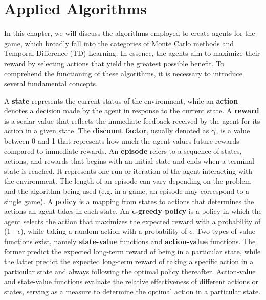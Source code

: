 \chapter{Applied Algorithms}
\label{applied_algo_chapter}
In this chapter, we will discuss the algorithms employed to create agents for the game, which broadly fall into the categories of Monte Carlo methods and Temporal Difference (TD) Learning. In essence, the agents aim to maximize their reward by selecting actions that yield the greatest possible benefit. To comprehend the functioning of these algorithms, it is necessary to introduce several fundamental concepts. 

A \textbf{state} represents the current status of the environment, while an \textbf{action} denotes a decision made by the agent in response to the current state. A \textbf{reward} is a scalar value that reflects the immediate feedback received by the agent for its action in a given state. The \textbf{discount factor}, usually denoted as $\bm{\gamma}$, is a value between 0 and 1 that represents how much the agent values future rewards compared to immediate rewards. An \textbf{episode} refers to a sequence of states, actions, and rewards that begins with an initial state and ends when a terminal state is reached. It represents one run or iteration of the agent interacting with the environment. The length of an episode can vary depending on the problem and the algorithm being used (e.g. in a game, an episode may correspond to a single game). A \textbf{policy} is a mapping from states to actions that determines the actions an agent takes in each state. An \textbf{$\bm{\epsilon}$-greedy policy} is a policy in which the agent selects the action that maximizes the expected reward with a probability of (1 - $\epsilon$), while taking a random action with a probability of $\epsilon$. Two types of value functions exist, namely \textbf{state-value} functions and \textbf{action-value} functions. The former predict the expected long-term reward of being in a particular state, while the latter predict the expected long-term reward of taking a specific action in a particular state and always following the optimal policy thereafter. Action-value and state-value functions evaluate the relative effectiveness of different actions or states, serving as a measure to determine the optimal action in a particular state.

